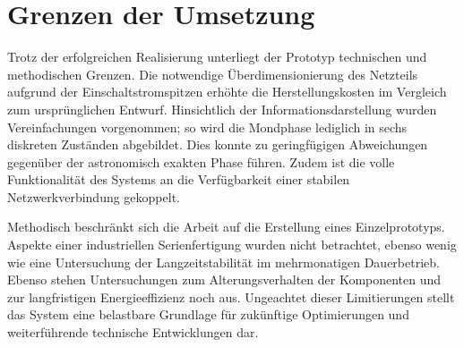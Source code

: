 \section{Grenzen der Umsetzung}
Trotz der erfolgreichen Realisierung unterliegt der Prototyp technischen und methodischen Grenzen.
Die notwendige Überdimensionierung des Netzteils aufgrund der Einschaltstromspitzen erhöhte die Herstellungskosten im Vergleich zum ursprünglichen Entwurf.
Hinsichtlich der Informationsdarstellung wurden Vereinfachungen vorgenommen; so wird die Mondphase lediglich in sechs diskreten Zuständen abgebildet.
Dies konnte zu geringfügigen Abweichungen gegenüber der astronomisch exakten Phase führen.
Zudem ist die volle Funktionalität des Systems an die Verfügbarkeit einer stabilen Netzwerkverbindung gekoppelt.

Methodisch beschränkt sich die Arbeit auf die Erstellung eines Einzelprototyps.
Aspekte einer industriellen Serienfertigung wurden nicht betrachtet, ebenso wenig wie eine Untersuchung der Langzeitstabilität im mehrmonatigen Dauerbetrieb.
Ebenso stehen Untersuchungen zum Alterungsverhalten der Komponenten und zur langfristigen Energieeffizienz noch aus.
Ungeachtet dieser Limitierungen stellt das System eine belastbare Grundlage für zukünftige Optimierungen und weiterführende technische Entwicklungen dar.